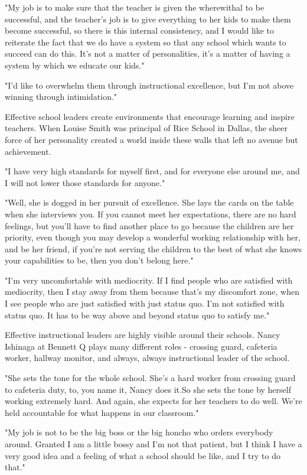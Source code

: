 "My job is to make sure that the teacher is given the wherewithal to be successful, and the teacher's job is to give everything to her kids to make them become successful, so there is this internal consistency, and I would like to reiterate the fact that we do have a system so that any school which wants to succeed can do this. It's not a matter of personalities, it's a matter of having a system by which we educate our kids."

"I'd like to overwhelm them through instructional excellence, but I'm not above winning through intimidation."

Effective school leaders create environments that encourage learning and inspire teachers. When Louise Smith was principal of Rice School in Dallas, the sheer force of her personality created a world inside these walls that left no avenue but achievement.

"I have very high standards for myself first, and for everyone else around me, and I will not lower those standards for anyone."

"Well, she is dogged in her pursuit of excellence. She lays the cards on the table when she interviews you. If you cannot meet her expectations, there are no hard feelings, but you'll have to find another place to go because the children are her priority, even though you may develop a wonderful working relationship with her, and be her friend, if you're not serving the children to the best of what she knows your capabilities to be, then you don't belong here."

"I'm very uncomfortable with mediocrity. If I find people who are satisfied with mediocrity, then I stay away from them because that's my discomfort zone, when I see people who are just satisfied with just status quo. I'm not satisfied with status quo. It has to be way above and beyond status quo to satisfy me."

Effective instructional leaders are highly visible around their schools. Nancy Ishinaga at Bennett Q plays many different roles - crossing guard, cafeteria worker, hallway monitor, and always, always instructional leader of the school.

"She sets the tone for the whole school. She's a hard worker from crossing guard to cafeteria duty, to, you name it, Nancy does it.So she sets the tone by herself working extremely hard. And again, she expects for her teachers to do well. We're held accountable for what happens in our classroom."

"My job is not to be the big boss or the big honcho who orders everybody around. Granted I am a little bossy and I'm not that patient, but I think I have a very good idea and a feeling of what a school should be like, and I try to do that."

